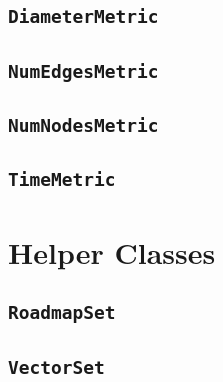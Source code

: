 \subsection{\texttt{DiameterMetric}}

\subsection{\texttt{NumEdgesMetric}}

\subsection{\texttt{NumNodesMetric}}

\subsection{\texttt{TimeMetric}}

\section{Helper Classes}

\subsection{\texttt{RoadmapSet}}

\subsection{\texttt{VectorSet}}


